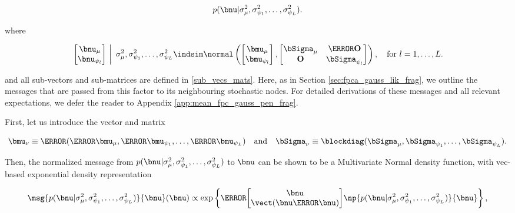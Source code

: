 \documentclass[12pt]{article}
\def\Sigmanu{\bSigma_{\nu}}
\def\munu{\bmu_{\nu}}
\def\sigsqmu{\sigma^2_{\mu}}
\def\mumu{\bmu_\mu}
\def\numu{\bnu_\mu}
\newcommand\nupsi[1]{\bnu_{\psi_{#1}}}
\newcommand\sigsqpsi[1]{\sigma^2_{\psi_{#1}}}
\newcommand\mupsi[1]{\bmu_{\psi_#1}}
\theoremstyle{plain}
\theoremstyle{definition}
\theoremstyle{remark}
\begin{document}
\[
	p (\bnu | \sigsqmu, \sigsqpsi{1}, \dots, \sigsqpsi{L}).
\]

\noindent where

\begin{equation}
	\left.\begin{bmatrix}
		\numu \\
		\nupsi{l}
	\end{bmatrix} \ \right| \ \sigsqmu, \sigsqpsi{1}, \dots, \sigsqpsi{L}
		\indsim
			\normal \left(
				\begin{bmatrix}
					\bmu_\mu \\
					\bmu_{\psi_l} \\
				\end{bmatrix},
				\begin{bmatrix}
					\bSigma_\mu & \T{\textbf{O}} \\
					\textbf{O} & \bSigma_{\psi_l}
				\end{bmatrix}
			\right), \quad \text{for $l = 1, \dots, L$.}
\label{mean_fpc_gauss_pen_factor}
\end{equation}

\noindent and all sub-vectors and sub-matrices are defined in \eqref{sub_vecs_mats}. Here, as in Section
\ref{sec:fpca_gauss_lik_frag}, we outline the messages that are passed from this factor to its neighbouring
stochastic nodes. For detailed derivations of these messages and all relevant expectations, we defer the
reader to Appendix \ref{app:mean_fpc_gauss_pen_frag}.

First, let us introduce the vector and matrix

\begin{equation}
	\munu \equiv \T{(\T{\mumu}, \T{\mupsi{1}}, \dots, \T{\mupsi{L}})} \quad
	\text{and} \quad
	\Sigmanu \equiv \blockdiag (\bSigma_\mu, \bSigma_{\psi_1}, \dots, \bSigma_{\psi_L}).
\label{munu_Sigmanu}
\end{equation}

\noindent Then, the normalized message from $p (\bnu | \sigsqmu, \sigsqpsi{1}, \dots, \sigsqpsi{L})$ to $\bnu$
can be shown to be a Multivariate Normal density function, with vec-based exponential density representation

\begin{equation}
	\msg{p (\bnu | \sigsqmu, \sigsqpsi{1}, \dots, \sigsqpsi{L})}{\bnu} (\bnu)
		\propto
			\exp \left\{
				\T{\begin{bmatrix}
					\bnu \\
					\vect (\bnu \T{\bnu})
				\end{bmatrix}}
				\np{p (\bnu | \sigsqmu, \sigsqpsi{1}, \dots, \sigsqpsi{L})}{\bnu}
			\right\},
\label{msg_pen_nu}
\end{equation}
\end{document}
